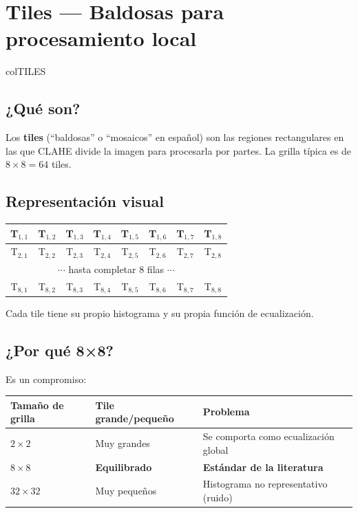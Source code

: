 \documentclass[11pt,a4paper]{article}
\begin{document}
\section{\textcolor{colTILES}{Tiles} — Baldosas para procesamiento local}
\begin{keybox}{colTILES}

\subsection*{¿Qué son?}

Los \textbf{tiles} (``baldosas'' o ``mosaicos'' en español) son las regiones
rectangulares en las que CLAHE divide la imagen para procesarla por partes.
La grilla típica es de \(8 \times 8 = 64\) tiles.

\subsection*{Representación visual}

\begin{center}
\begin{tabular}{|c|c|c|c|c|c|c|c|}
\hline
T$_{1,1}$ & T$_{1,2}$ & T$_{1,3}$ & T$_{1,4}$ & T$_{1,5}$ & T$_{1,6}$ & T$_{1,7}$ & T$_{1,8}$ \\
\hline
T$_{2,1}$ & T$_{2,2}$ & T$_{2,3}$ & T$_{2,4}$ & T$_{2,5}$ & T$_{2,6}$ & T$_{2,7}$ & T$_{2,8}$ \\
\hline
\multicolumn{8}{|c|}{$\cdots$ hasta completar 8 filas $\cdots$} \\
\hline
T$_{8,1}$ & T$_{8,2}$ & T$_{8,3}$ & T$_{8,4}$ & T$_{8,5}$ & T$_{8,6}$ & T$_{8,7}$ & T$_{8,8}$ \\
\hline
\end{tabular}
\end{center}

Cada tile tiene su propio histograma y su propia función de ecualización.

\subsection*{¿Por qué 8×8?}

Es un compromiso:

\begin{table}[H]
\centering
\begin{tabular}{@{}lll@{}}
\toprule
Tamaño de grilla & Tile grande/pequeño & Problema \\
\midrule
\(2 \times 2\)   & Muy grandes & Se comporta como ecualización global \\
\(8 \times 8\)   & \textbf{Equilibrado} & \textbf{Estándar de la literatura} \\
\(32 \times 32\) & Muy pequeños & Histograma no representativo (ruido) \\
\bottomrule
\end{tabular}
\end{table}


\end{keybox}
\end{document}
